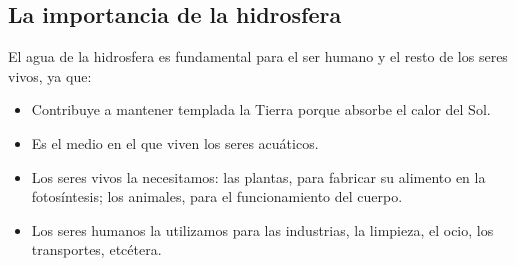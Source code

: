 \subsection{La importancia de la hidrosfera}

El agua de la hidrosfera es fundamental para el ser humano y el resto de los seres vivos, ya que:
\begin{itemize}
    \item Contribuye a mantener templada la Tierra porque absorbe el calor del Sol.
    \item Es el medio en el que viven los seres acuáticos.
    \item Los seres vivos la necesitamos: las plantas, para fabricar su alimento en la fotosíntesis; los animales, para el funcionamiento del cuerpo.
    \item Los seres humanos la utilizamos para las industrias, la limpieza, el ocio, los transportes, etcétera.
\end{itemize}